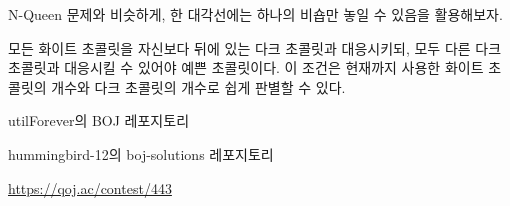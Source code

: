 \begin{hint}
    N-Queen 문제와 비슷하게, 한 대각선에는 하나의 비숍만 놓일 수 있음을 활용해보자.
\end{hint}

\begin{hint}
    
\end{hint}

\begin{hint}
    모든 화이트 초콜릿을 자신보다 뒤에 있는 다크 초콜릿과 대응시키되, 모두 다른 다크 초콜릿과 대응시킬 수 있어야 예쁜 초콜릿이다. 이 조건은 현재까지 사용한 화이트 초콜릿의 개수와 다크 초콜릿의 개수로 쉽게 판별할 수 있다.
\end{hint}

\begin{hint}
    utilForever의 BOJ 레포지토리
\end{hint}

\begin{hint}
    hummingbird-12의 boj-solutions 레포지토리
\end{hint}

\begin{hint}
    \url{https://qoj.ac/contest/443}
\end{hint}

